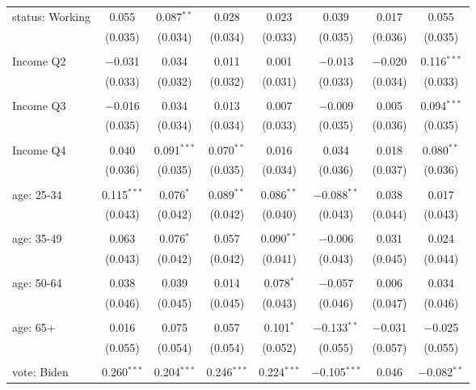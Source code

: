 \begin{tabular}{@{\extracolsep{5pt}}lccccccc}
 status: Working & 0.055 & 0.087$^{**}$ & 0.028 & 0.023 & 0.039 & 0.017 & 0.055 \\ 
  & (0.035) & (0.034) & (0.034) & (0.033) & (0.035) & (0.036) & (0.035) \\ 
  & & & & & & & \\ 
 Income Q2 & $-$0.031 & 0.034 & 0.011 & 0.001 & $-$0.013 & $-$0.020 & 0.116$^{***}$ \\ 
  & (0.033) & (0.032) & (0.032) & (0.031) & (0.033) & (0.034) & (0.033) \\ 
  & & & & & & & \\ 
 Income Q3 & $-$0.016 & 0.034 & 0.013 & 0.007 & $-$0.009 & 0.005 & 0.094$^{***}$ \\ 
  & (0.035) & (0.034) & (0.034) & (0.033) & (0.035) & (0.036) & (0.035) \\ 
  & & & & & & & \\ 
 Income Q4 & 0.040 & 0.091$^{***}$ & 0.070$^{**}$ & 0.016 & 0.034 & 0.018 & 0.080$^{**}$ \\ 
  & (0.036) & (0.035) & (0.035) & (0.034) & (0.036) & (0.037) & (0.036) \\ 
  & & & & & & & \\ 
 age: 25-34 & 0.115$^{***}$ & 0.076$^{*}$ & 0.089$^{**}$ & 0.086$^{**}$ & $-$0.088$^{**}$ & 0.038 & 0.017 \\ 
  & (0.043) & (0.042) & (0.042) & (0.040) & (0.043) & (0.044) & (0.043) \\ 
  & & & & & & & \\ 
 age: 35-49 & 0.063 & 0.076$^{*}$ & 0.057 & 0.090$^{**}$ & $-$0.006 & 0.031 & 0.024 \\ 
  & (0.043) & (0.042) & (0.042) & (0.041) & (0.043) & (0.045) & (0.044) \\ 
  & & & & & & & \\ 
 age: 50-64 & 0.038 & 0.039 & 0.014 & 0.078$^{*}$ & $-$0.057 & 0.006 & 0.034 \\ 
  & (0.046) & (0.045) & (0.045) & (0.043) & (0.046) & (0.047) & (0.046) \\ 
  & & & & & & & \\ 
 age: 65+ & 0.016 & 0.075 & 0.057 & 0.101$^{*}$ & $-$0.133$^{**}$ & $-$0.031 & $-$0.025 \\ 
  & (0.055) & (0.054) & (0.054) & (0.052) & (0.055) & (0.057) & (0.055) \\ 
  & & & & & & & \\ 
 vote: Biden & 0.260$^{***}$ & 0.204$^{***}$ & 0.246$^{***}$ & 0.224$^{***}$ & $-$0.105$^{***}$ & 0.046 & $-$0.082$^{**}$ \\ 

\end{tabular}
